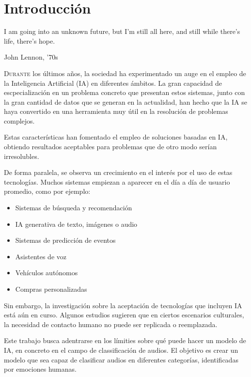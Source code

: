 \chapter{Introducción}\label{chp-01}
\epigraph{I am going into an unknown future, but I'm still all here, and still while there's life, there's hope.}{John Lennon, '70s}

\lettrine[lraise=-0.1, lines=2, loversize=0.2]{D}{urante} los últimos años, la sociedad ha experimentado un auge en el empleo de la Inteligencia Artificial (IA) en diferentes ámbitos. 
La gran capacidad de escpecialización en un problema concreto que presentan estos sistemas, junto con la gran cantidad de datos que se generan en la actualidad, han hecho que la IA se haya convertido en una herramienta muy útil en la resolución de problemas complejos.

Estas características han fomentado el empleo de soluciones basadas en IA, obtiendo resultados aceptables para problemas que de otro modo serían irresolubles.

De forma paralela, se observa un crecimiento en el interés por el uso de estas tecnologías.
Muchos sistemas empiezan a aparecer en el día a día de usuario promedio, como por ejemplo: \cite{VIU_article}

\begin{itemize}\itemsep1pt \parskip0pt 
\item Sistemas de búsqueda y recomendación
\item IA generativa de texto, imágenes o audio
\item Sistemas de predicción de eventos
\item Asistentes de voz
\item Vehículos autónomos
\item Compras personalizadas
\end{itemize}

Sin embargo, la investigación sobre la aceptación de tecnologías que incluyen IA está aún en curso. 
Algunos estudios sugieren que en ciertos escenarios culturales, la necesidad de contacto humano no puede ser replicada o reemplazada. \cite{KELLY2023101925}

Este trabajo busca adentrarse en los límities sobre qué puede hacer un modelo de IA, en concreto en el campo de classificación de audios.
El objetivo es crear un modelo que sea capaz de clasificar audios en diferentes categorías, identificadas por emociones humanas. 

